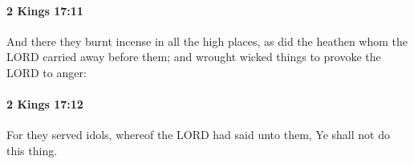 		\paragraph{2 Kings 17:11} %
			\label{2KINGS-17-11}

			And there they burnt incense in all the high places, as did the heathen whom the LORD carried away before them; and wrought wicked things to provoke the LORD to anger:


		\paragraph{2 Kings 17:12} %
			\label{2KINGS-17-12}

			For they served idols, whereof the LORD had said unto them, Ye shall not do this thing.


